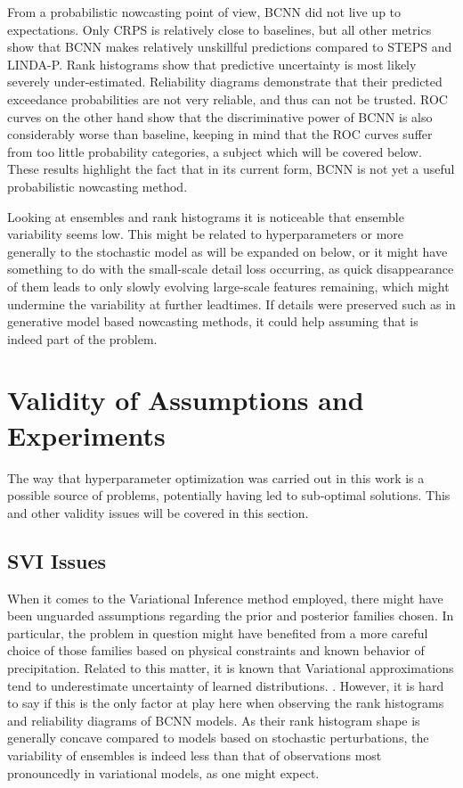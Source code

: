 From a probabilistic nowcasting point of view, BCNN did not live up to expectations. Only CRPS is relatively close to baselines, but all other metrics show that BCNN makes relatively unskillful predictions compared to STEPS and LINDA-P. Rank histograms show that predictive uncertainty is most likely severely under-estimated. Reliability diagrams demonstrate that their predicted exceedance probabilities are not very reliable, and thus can not be trusted. ROC curves on the other hand show that the discriminative power of BCNN is also considerably worse than baseline, keeping in mind that the ROC curves suffer from too little probability categories, a subject which will be covered below. These results highlight the fact that in its current form, BCNN is not yet a useful probabilistic nowcasting method.

Looking at ensembles and rank histograms it is noticeable that ensemble variability seems low. This might be related to hyperparameters or more generally to the stochastic model as will be expanded on below, or it might have something to do with the small-scale detail loss occurring, as quick disappearance of them leads to only slowly evolving large-scale features remaining, which might undermine the variability at further leadtimes. If details were preserved such as in generative model based nowcasting methods, it could help assuming that is indeed part of the problem.%


\section{Validity of Assumptions and Experiments}

The way that hyperparameter optimization was carried out in this work is a possible source of problems, potentially having led to sub-optimal solutions. This and other validity issues will be covered in this section.

\subsection{SVI Issues}

When it comes to the Variational Inference method employed, there might have been unguarded assumptions regarding the prior and posterior families chosen. In particular, the problem in question might have benefited from a more careful choice of those families based on physical constraints and known behavior of precipitation.   
Related to this matter, it is known that Variational approximations tend to underestimate uncertainty of learned distributions. \cite{bishop2006pattern, minka_family_nodate}. However, it is hard to say if this is the only factor at play here when observing the rank histograms and reliability diagrams of BCNN models. As their rank histogram shape is generally concave compared to models based on stochastic perturbations, the variability of ensembles is indeed less than that of observations most pronouncedly in variational models, as one might expect. 

